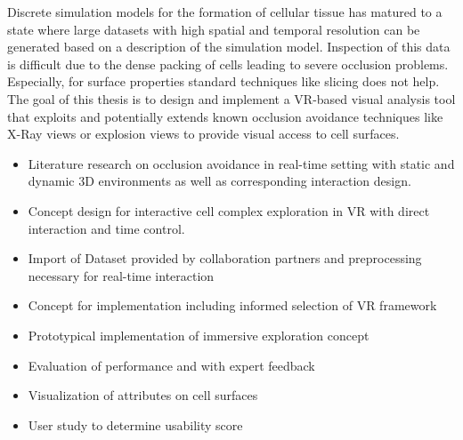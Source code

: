 


\begin{task}[] %
	\minisec{\objectivesname}\smallskip	
	
Discrete simulation models for the formation of cellular tissue has matured to a state where large
datasets with high spatial and temporal resolution can be generated based on a description of the
simulation model. Inspection of this data is difficult due to the dense packing of cells leading to
severe occlusion problems. Especially, for surface properties standard techniques like slicing does
not help. The goal of this thesis is to design and implement a VR-based visual analysis tool that
exploits and potentially extends known occlusion avoidance techniques like X-Ray views or explosion views to provide visual access to cell surfaces.
	
	\minisec{\focusname}\smallskip
	\begin{itemize}
		\item Literature research on occlusion avoidance in real-time setting with static and dynamic 3D environments as well as corresponding interaction design.
		\item Concept design for interactive cell complex exploration in VR with direct interaction and time control.
		\item Import of Dataset provided by collaboration partners and preprocessing necessary for real-time interaction
		\item Concept for implementation including informed selection of VR framework
		\item Prototypical implementation of immersive exploration concept
		\item Evaluation of performance and with expert feedback
	\end{itemize}
	\smallskip
	\begin{itemize}
	\item Visualization of attributes on cell surfaces
	\item User study to determine usability score
\end{itemize}
\end{task}

